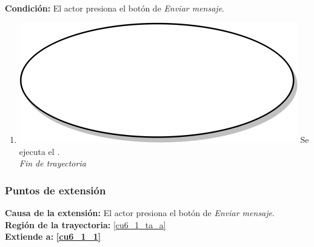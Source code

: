 \textbf{} \\
\textbf{Condición:} El actor presiona el botón de \textit{Enviar mensaje}. \\
 \begin{enumerate}[label=A\arabic*]
    \item {\includegraphics[scale=.05]{Capitulo3/img/proceso.png} Se ejecuta el \textbf{}.} \\
    \textit{Fin de trayectoria} \\
\end{enumerate}

\subsubsection{Puntos de extensión}
\noindent \textbf{Causa de la extensión:}  El actor presiona el botón de \textit{Enviar mensaje}. \\
\textbf{Región de la trayectoria:} \ref{cu6_1_ta_a} \\
\textbf{Extiende a:} \textbf{\ref{cu6_1_1}}

